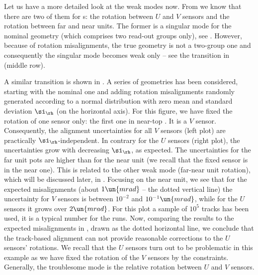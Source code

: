 Let us have a more detailed look at the weak modes now. From  we know that there are two of them for  s: the rotation between $U$ and $V$ sensors and the rotation between far and near units. The former is a singular mode for the nominal geometry (which comprises two read-out groups only), see . However, because of rotation misalignments, the true geometry is not a two-group one and consequently the singular mode becomes weak only -- see the transition in  (middle row).

A similar transition is shown in . A series of geometries has been considered, starting with the nominal one and adding rotation misalignments randomly generated according to a normal distribution with zero mean and standard deviation $\si_\rh$ (on the horizontal axis). For this figure, we have fixed the rotation of one sensor only: the first one in near-top . It is a $V$ sensor. Consequently, the alignment uncertainties for all $V$ sensors (left plot) are practically $\si_\rh$-independent. In contrary for the $U$ sensors (right plot), the uncertainties grow with decreasing $\si_\rh$, as expected. The uncertainties for the far unit pots are higher than for the near unit (we recall that the fixed sensor is in the near one). This is related to the other weak mode (far-near unit rotation), which will be discussed later, in . Focusing on the near unit, we see that for the expected misalignments (about $1\un{mrad}$ -- the dotted vertical line) the uncertainty for $V$ sensors is between $10^{-2}$ and $10^{-1}\un{mrad}$, while for the $U$ sensors it grows over $2\un{mrad}$. For this plot a sample of $10^5$ tracks has been used, it is a typical number for the  runs. Now, comparing the results to the expected misalignments in , drawn as the dotted horizontal line, we conclude that the track-based alignment can not provide reasonable corrections to the $U$ sensors' rotations. We recall that the $U$ sensors turn out to be problematic in this example as we have fixed the rotation of the $V$ sensors by the constraints. Generally, the troublesome mode is the relative rotation between $U$ and $V$ sensors.

